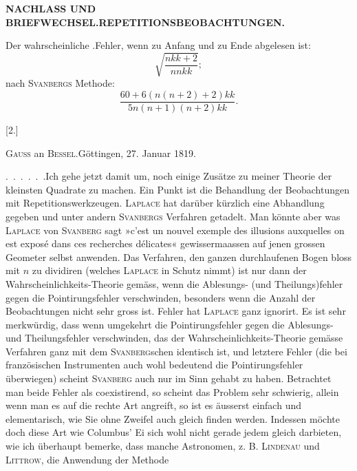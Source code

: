 \par\clearpage
\noindent\null\hfill{\small\textbf{NACHLASS UND BRIEFWECHSEL.\quad REPETITIONSBEOBACHTUNGEN.}}\hfill{}\par\medskip
\par\noindent\hspace*{\parindent}Der wahrscheinliche .Fehler, wenn  zu Anfang und zu Ende abgelesen ist:
\[
\sqrt{\frac{nkk+2}{nnkk}};
\]
\noindent nach \textsc{Svanbergs} Methode:
\[
\frac{60+6(n(n+2)+2)kk}{5n(n+1)(n+2)kk}.
\]
\begin{center}\vspace{.7cm}[2.]\par\bigskip
{\large\textsc{Gauss} an \textsc{Bessel}.\quad Göttingen, 27. Januar 1819.}\end{center}
\par\noindent\hspace*{\parindent}.\ .\ .\ .\ .\ .\enspace Ich gehe jetzt damit um, noch einige Zusätze zu meiner Theorie der kleinsten Quadrate zu machen. Ein Punkt ist die Behandlung der Beobachtungen mit Repetitionswerkzeugen. \textsc{Laplace} hat darüber kürzlich eine Abhandlung gegeben und unter andern \textsc{Svanbergs} Verfahren getadelt. Man könnte aber was \textsc{Laplace} von \textsc{Svanberg} sagt »c’est un nouvel exemple des illusions auxquelles on est exposé dans ces recherches délicates« gewissermaassen auf jenen grossen Geometer selbst anwenden. Das Verfahren, den ganzen durchlaufenen Bogen bloss mit $n$ zu dividiren (welches \textsc{Laplace} in Schutz nimmt) ist nur dann der Wahrscheinlichkeits-Theorie gemäss, wenn die Ablesungs- (und Theilungs)fehler gegen die Pointirungsfehler verschwinden, besonders wenn die Anzahl der Beobachtungen nicht sehr gross ist.  Fehler hat \textsc{Laplace} ganz ignorirt. Es ist sehr merkwürdig, dass wenn umgekehrt die Pointirungsfehler gegen die Ablesungs- und Theilungsfehler verschwinden, das der Wahrscheinlichkeits-Theorie gemässe Verfahren ganz mit dem \textsc{Svanberg}schen identisch ist, und letztere Fehler (die bei französischen Instrumenten auch wohl bedeutend die Pointirungsfehler überwiegen) scheint \textsc{Svanberg} auch nur im Sinn gehabt zu haben. Betrachtet man beide Fehler als coexistirend, so scheint das Problem sehr schwierig, allein wenn man es auf die rechte Art angreift, so ist es äusserst einfach und elementarisch, wie Sie ohne Zweifel auch gleich finden werden. Indessen möchte doch diese Art wie Columbus’ Ei sich wohl nicht gerade jedem gleich darbieten, wie ich überhaupt bemerke, dass manche Astronomen, z. B. \textsc{Lindenau} und \textsc{Littrow}, die Anwendung der Methode
\par\medskip\noindent\makebox[.86\linewidth][r]{65\textsuperscript{*}}\par

